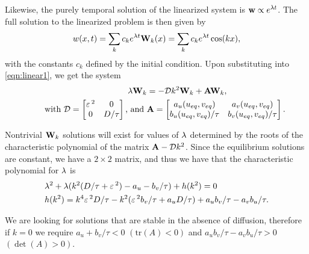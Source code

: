 Likewise, the purely temporal solution of the linearized system is $\mathbf{w}\propto e^{\lambda t}$. The full solution to the linearized problem is then given by
% 
\begin{equation*}
\begin{split}
\begin{aligned}
	w(x,t) = \sum_kc_ke^{\lambda t}\mathbf{W}_k(x) = \sum_kc_ke^{\lambda t}\cos(kx),
\end{aligned}
\end{split}
\end{equation*}
% 
with the constants $c_k$ defined by the initial condition. Upon substituting into \eqref{eqn:linear1}, we get the system
% 
\begin{equation*}
\begin{aligned}
	\lambda \mathbf{W}_k &= -\mathcal{D} k^2\mathbf{W}_k + \mathbf{A}\mathbf{W}_k,\\ \qquad \textrm{with }
  \mathcal{D} =\begin{bmatrix}
		\varepsilon\,^2 & 0 \\
		0 & D/\tau
  \end{bmatrix} \textrm{, and }
  &\mathbf{A} =
	\begin{bmatrix}
		a_u(u_{eq},v_{eq})& a_v(u_{eq},v_{eq}) \\
		b_u(u_{eq},v_{eq})/\tau& b_v(u_{eq},v_{eq})/\tau
  \end{bmatrix}.
\end{aligned}
\end{equation*}

Nontrivial $\mathbf{W}_k$ solutions will exist for values of $\lambda$ determined by the roots of the characteristic polynomial of the matrix $\mathbf{A} - \mathcal{D} k^2$. Since the equilibrium solutions are constant, we have a $2\times 2$ matrix, and thus we have that the characteristic polynomial for $\lambda$ is
% 
\begin{equation*}
\begin{split}
\begin{aligned}
  &\lambda^2 + \lambda(k^2(D/\tau + \varepsilon\,^2) - a_u - b_v/\tau) + h(k^2) = 0 \\
  &h(k^2) = k^4\varepsilon\,^2D/\tau - k^2(\varepsilon\,^2b_v/\tau + a_uD/\tau) + a_ub_v/\tau - a_vb_u/\tau.
\end{aligned}
\end{split}
\end{equation*}

We are looking for solutions that are stable in the absence of diffusion, therefore if $k=0$ we require $a_u+b_v/\tau<0$ $(\textrm{tr}(A)<0)$ and $a_ub_v/\tau - a_vb_u/\tau>0$ $(\det(A)>0)$.


